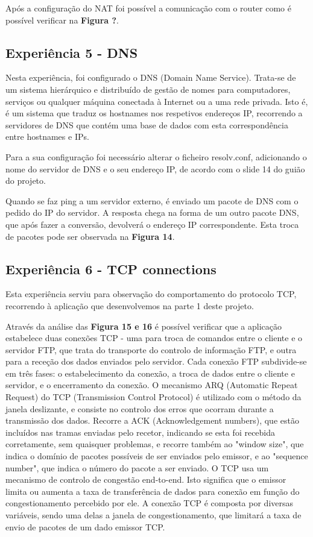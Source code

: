 \documentclass[article, a4paper, 11pt, oneside]{memoir}
\begin{document}
Após a configuração do NAT foi possível a comunicação com o router como é possível verificar na \textbf{Figura ?}.

\subsection{Experiência 5 - DNS}			

Nesta experiência, foi configurado o DNS (Domain Name Service). Trata-se de um sistema hierárquico e distribuído de gestão 
de nomes para computadores, serviços ou qualquer máquina conectada à
 Internet ou a uma rede privada.
Isto é, é um sistema que traduz os hostnames nos respetivos endereços IP, 
recorrendo a servidores de DNS que contém uma base de dados com esta correspondência entre hostnames e IPs.

Para a sua configuração foi necessário alterar o ficheiro resolv.conf, 
adicionando o nome do servidor de DNS e o seu endereço IP, de acordo com o slide 14 do guião do projeto.

Quando se faz ping a um servidor externo, é enviado um pacote de DNS com o pedido do IP do servidor.
A resposta chega na forma de um outro pacote DNS, que após fazer a conversão, 
devolverá o endereço IP correspondente.
Esta troca de pacotes pode ser observada na \textbf{Figura 14}.

\subsection{Experiência 6 - TCP connections}

Esta experiência serviu para observação do comportamento do protocolo TCP, 
recorrendo à aplicação que desenvolvemos na parte 1 deste projeto. 

Através da análise das \textbf{Figura 15 e 16} é possível verificar que a aplicação estabelece duas conexões TCP - 
uma para troca de comandos entre o cliente e o servidor FTP, 
que trata do transporte do controlo de informação FTP, e outra para a receção dos dados enviados pelo servidor.
Cada conexão FTP subdivide-se em três fases: o estabelecimento da conexão, a troca de dados entre o cliente e servidor, e o encerramento da conexão.
O mecanismo ARQ (Automatic Repeat Request) do TCP (Transmission Control Protocol) é utilizado com o método da janela deslizante, 
e consiste no controlo dos erros que ocorram durante a transmissão dos dados.
Recorre a ACK (Acknowledgement numbers), que estão incluídos nas tramas enviadas pelo recetor, indicando se esta foi 
recebida corretamente, sem quaisquer problemas, e recorre também ao "window size", que indica o domínio de pacotes 
possíveis de ser enviados pelo emissor, e ao "sequence number", que indica o número do pacote a ser enviado.
O TCP usa um mecanismo de controlo de congestão end-to-end. Isto significa que o emissor limita ou aumenta a taxa de 
transferência de dados para conexão em função do congestionamento percebido por ele.
A conexão TCP é composta por diversas variáveis, sendo uma delas a janela de congestionamento, que limitará a taxa de envio de pacotes de um dado emissor TCP.
\end{document}
